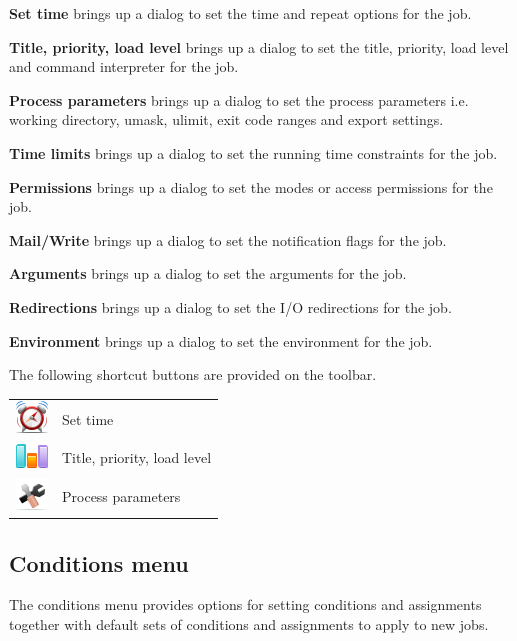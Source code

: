 \textbf{Set time} brings up a dialog to set the time and repeat options for the job.

\textbf{Title, priority, load level} brings up a dialog to set the title, priority, load level and command
interpreter for the job.

\textbf{Process parameters} brings up a dialog to set the process parameters i.e. working directory, umask,
ulimit, exit code ranges and export settings.

\textbf{Time limits} brings up a dialog to set the running time constraints for the job.

\textbf{Permissions} brings up a dialog to set the modes or access permissions for the job.

\textbf{Mail/Write} brings up a dialog to set the notification flags for the job.

\textbf{Arguments} brings up a dialog to set the arguments for the job.

\textbf{Redirections} brings up a dialog to set the I/O redirections for the job.

\textbf{Environment} brings up a dialog to set the environment for the job.

The following shortcut buttons are provided on the toolbar.

\begin{tabular}{l p{12cm}}
\includegraphics{img/btqwtimeset.png} & Set time\\
\includegraphics{img/btqwtitprill.png} & Title, priority, load level\\
\includegraphics{img/btqwprocpar.png} & Process parameters\\
\end{tabular}

\subsection{Conditions menu}
The conditions menu provides options for setting conditions and assignments together with
default sets of conditions and assignments to apply to new jobs.

